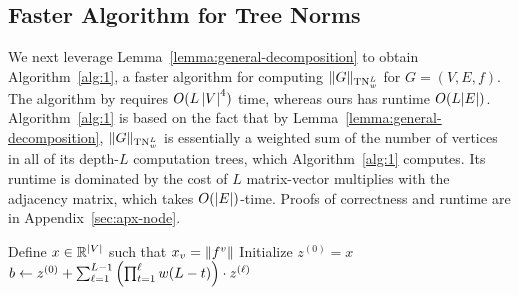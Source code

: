 \subsection{Faster Algorithm for Tree Norms}\label{sec:alg}
We next leverage Lemma~\ref{lemma:general-decomposition} to obtain  Algorithm~\ref{alg:1}, a faster algorithm for computing $\Vert G \Vert_{\textnormal{TN}_w^L}$ for $G = (V, E, f).$ The algorithm by \citet{Chuang22:Tree} requires $O(L \left\lvert V\right\rvert^4)$ time, whereas ours {has runtime} $O(L |E|)$. Algorithm~\ref{alg:1} is based on the fact that by Lemma~\ref{lemma:general-decomposition}, $\Vert G \Vert_{\textnormal{TN}_w^L}$ is essentially a weighted sum of the number of vertices in all of its depth-$L$ computation trees, which Algorithm~\ref{alg:1} {computes}. Its runtime is dominated by the cost of $L$ matrix-vector {multiplies} with the adjacency matrix, which takes $O(|E|)$-time. Proofs of correctness and runtime are in Appendix~\ref{sec:apx-node}. \\

\begin{algorithm2e}[H]
\caption{($G, L, w$)}\label{alg:1}
Define $x \in \mathbb R^{|V|}$ such that $x_v = \left\lVert f^v\right\rVert$ \label{line:x}\; 
Initialize $z^{(0)} = x$\; 
$b \gets z^{(0)} + \sum_{\ell = 1}^{L-1} \left(\prod_{t=1}^\ell w(L-t) \right ) \cdot z^{(\ell)}$\;  
\end{algorithm2e}

